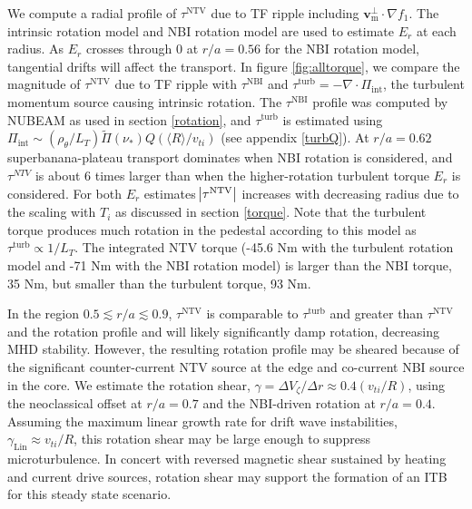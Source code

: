 \documentclass[aip, pop, preprint]{revtex4-1}
\numberwithin{figure}{section}
\numberwithin{equation}{section}
\begin{document}
\FloatBarrier
We compute a radial profile of $\tau^{\mathrm{NTV}}$ due to TF ripple including $\bm{v}_{\text{m}}^{\perp} \cdot \nabla f_1$. The intrinsic rotation model and NBI rotation model are used to estimate $E_r$ at each radius. As $E_r$ crosses through 0 at $r/a = 0.56$ for the NBI rotation model, tangential drifts will affect the transport. In figure \ref{fig:alltorque}, we compare the magnitude of $\tau^{\mathrm{NTV}}$ due to TF ripple with $\tau^{\mathrm{NBI}}$ and $\tau^{\mathrm{turb}} = -\nabla \cdot \Pi_{\mathrm{int}}$, the turbulent momentum source causing intrinsic rotation. The $\tau^{\mathrm{NBI}}$ profile was computed by NUBEAM as used in section \ref{rotation}, and $\tau^{\mathrm{turb}}$ is estimated using $\Pi_{\mathrm{int}} \sim (\rho_{\theta}/L_T) \widetilde{\Pi}(\nu_*) Q (\langle R \rangle/v_{ti})$ (see appendix \ref{turbQ}). At $r/a = 0.62$ superbanana-plateau transport dominates when NBI rotation is considered, and $\tau^{NTV}$ is about 6 times larger than when the higher-rotation turbulent torque $E_r$ is considered. For both $E_r$ estimates $\abs{\tau^{\text{NTV}}}$ increases with decreasing radius due to the scaling with $T_i$ as discussed in section \ref{torque}. Note that the turbulent torque produces much rotation in the pedestal according to this model as $\tau^{\mathrm{turb}} \propto 1/L_T$. The integrated NTV torque (-45.6 Nm with the turbulent rotation model and -71 Nm with the NBI rotation model) is larger than the NBI torque, 35 Nm, but smaller than the turbulent torque, 93 Nm. 

In the region $0.5 \lesssim r/a \lesssim 0.9$, $\tau^{\mathrm{NTV}}$ is comparable to $\tau^{\mathrm{turb}}$ and greater than $\tau^{\mathrm{NTV}}$ and the rotation profile and will likely significantly damp rotation, decreasing MHD stability. However, the resulting rotation profile may be sheared because of the significant counter-current NTV source at the edge and co-current NBI source in the core. We estimate the rotation shear, $\gamma = \Delta V_{\zeta}/ \Delta r \approx 0.4 (v_{ti}/R)$, using the neoclassical offset at $r/a = 0.7$ and the NBI-driven rotation at $r/a = 0.4$. Assuming the maximum linear growth rate for drift wave instabilities, $\gamma_{\mathrm{Lin}} \approx v_{ti}/R$,\cite{Connor2004} this rotation shear may be large enough to suppress microturbulence. In concert with reversed magnetic shear sustained by heating and current drive sources,\cite{Poli2014} rotation shear may support the formation of an ITB \cite{Waltz1994} for this steady state scenario. 
\end{document}
